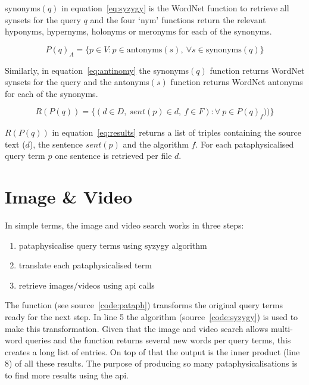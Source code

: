 synonyms$(q)$ in equation~\ref{eq:syzygy} is the WordNet function to retrieve all synsets for the query $q$ and the four `nym' functions return the relevant hyponyms, hypernyms, holonyms or meronyms for each of the synonyms.

\begin{equation}
  P(q)_A = \{p \in V: p \in \text{antonyms}(s), \ \forall s \in \text{synonyms}(q)\}
  \label{eq:antinomy}
\end{equation}

Similarly, in equation~\ref{eq:antinomy} the synonyms$(q)$ function returns WordNet synsets for the query and the antonyms$(s)$ function returns WordNet antonyms for each of the synonyms.

\begin{equation}
  R(P(q)) = \{(d \in D, \ sent(p) \in d, \ f \in F): \forall \ p \in P(q)_f)) \}
  \label{eq:results}
\end{equation}

$R(P(q))$ in equation~\ref{eq:results} returns a list of triples containing the source text ($d$), the sentence $sent(p)$ and the algorithm $f$. For each pataphysicalised query term $p$ one sentence is retrieved per file $d$.


\section{Image \& Video}
\label{s:imgvid}

In simple terms, the image and video search works in three steps:
\begin{enumerate}
  \item pataphysicalise query terms using syzygy algorithm
  \item translate each pataphysicalised term
  \item retrieve images/videos using \acs{api} calls
\end{enumerate}

The  function (see source~\ref{code:pataph}) transforms the original query terms ready for the next step. In line \num{5} the  algorithm (source~\ref{code:syzygy}) is used to make this transformation. Given that the image and video search allows multi-word queries and the  function returns several new words per query terms, this creates a long list of entries. On top of that the output is the inner product (line 8) of all these results. The purpose of producing so many pataphysicalisations is to find more results using the \ac{api}.


